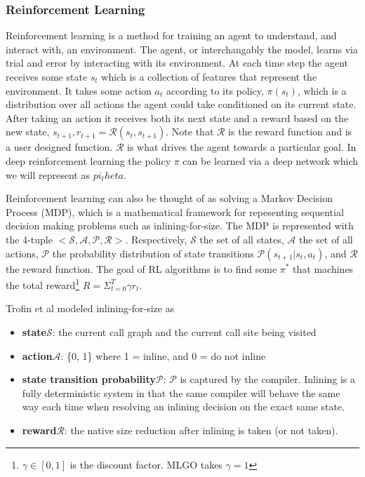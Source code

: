 \documentclass[nohyperref]{article}
\theoremstyle{plain}
\theoremstyle{definition}
\theoremstyle{remark}
\begin{document}
\subsubsection{Reinforcement Learning}
Reinforcement learning is a method for training an agent to understand, and interact with, an environment. The agent, or interchangably the model, learns via trial and error by interacting with its environment. At each time step the agent receives some state $s_t$ which is a collection of features that represent the environment. It takes some action $a_t$ according to its policy, $\pi(s_t)$, which is a distribution over all actions the agent could take conditioned on its current state. After taking an action it receives both its next state and a reward based on the new state, $s_{t+1}, r_{t+1} = \mathcal{R}(s_t, s_{t+1})$. Note that $\mathcal{R}$ is the reward function and is a user designed function. $\mathcal{R}$ is what drives the agent towards a particular goal. In deep reinforcement learning the policy $\pi$ can be learned via a deep network which we will represent as $pi_theta$.

Reinforcement learning can also be thought of as solving a Markov Decision Process (MDP), which is a mathematical framework for repesenting sequential decision making problems such as inlining-for-size. The MDP is represented with the 4-tuple $<\mathcal{S}, \mathcal{A}, \mathcal{P}, \mathcal{R}>$. Respectively, $\mathcal{S}$ the set of all states, $\mathcal{A}$ the set of all actions, $\mathcal{P}$ the probability distribution of state transitions $\mathcal{P}(s_{t+1}|s_t,a_t)$, and $\mathcal{R}$ the reward function. The goal of RL algorithms is to find some $\pi^*$ that machines the total reward\footnote{$\gamma \in [0, 1]$ is the discount factor. MLGO takes $\gamma = 1$} $R = \Sigma^{T}_{t=0}\gamma r_t$.

Trofin et al modeled inlining-for-size as
\begin{itemize}
\item\textbf{state}\;$\mathcal{S}$: the current call graph and the current call site being visited
\item\textbf{action}\;$\mathcal{A}$: \{0, 1\} where 1 = inline, and 0 = do not inline
\item\textbf{state transition probability}\;$\mathcal{P}$: $\mathcal{P}$ is captured by the compiler. Inlining is a fully deterministic system in that the same compiler will behave the same way each time when resolving an inlining decision on the exact same state.
\item\textbf{reward}\;$\mathcal{R}$: the native size reduction after inlining is taken (or not taken).
\end{itemize}
\end{document}
